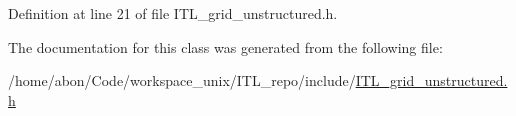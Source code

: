 Definition at line 21 of file ITL\_\-grid\_\-unstructured.h.



The documentation for this class was generated from the following file:\begin{DoxyCompactItemize}
\item 
/home/abon/Code/workspace\_\-unix/ITL\_\-repo/include/\hyperlink{ITL__grid__unstructured_8h}{ITL\_\-grid\_\-unstructured.h}\end{DoxyCompactItemize}
